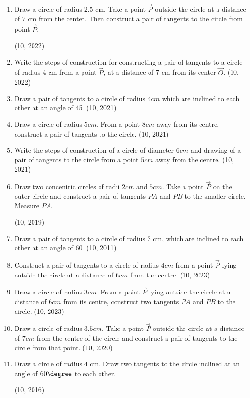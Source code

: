 \begin{enumerate}[label=\thesubsection.\arabic*,ref=\thesubsection.\theenumi]
	\item Draw a circle of radius 2.5 cm. Take a point $\vec{P}$ outside the circle at a distance of 7 cm from the center. Then construct a pair of tangents to the circle from point $\vec{P}$.

\hfill (10, 2022)
	\item Write the steps of construction for constructing a pair of tangents to a circle of radius 4 cm from a point $\vec{P}$, at a distance of 7 cm from its center $\vec{O}$.
\hfill (10, 2022)
	\item Draw a pair of tangents to a circle of radius $4 cm$ which are inclined to each other at an angle of 45\degree.	
\hfill (10, 2021)
	\item Draw a circle of radius $5 cm$. From a point $8 cm$ away from its centre, construct a pair of tangents to the circle.
\hfill (10, 2021)
	\item Write the steps of construction of a circle of diameter $6 cm$ and drawing of a pair of tangents to the circle from a point $5 cm$ away from the centre.
\hfill (10, 2021)
\item Draw two concentric circles of radii $2 cm$ and $5 cm$. Take a point $\vec{P}$ on the outer circle and construct a pair of tangents $PA$ and $PB$ to the smaller circle. Measure $PA$.  

\hfill (10, 2019)
    \item Draw a pair of tangents to a circle of radius $3$ cm, which are inclined to each other at an angle of 60\degree.
\hfill (10, 2011)
\item Construct a pair of tangents to a circle of radius $4cm$ from a point $\vec{P}$ lying outside the circle at a distance of $6cm$ from the centre.
\hfill (10, 2023)
	\item  Draw a circle of radius $3 cm$. From a point $\vec{P}$ lying outside the 
       circle at a distance of $6cm$ from its centre, construct two tangents
       $PA$ and $PB$ to the circle.
\hfill (10, 2023)
	\item Draw a circle of radius $3.5 cm$. Take a point $\vec{P}$ outside the circle at a distance of $7 cm$ from the centre of the circle and construct a pair of tangents to the circle from that point.
\hfill (10, 2020)
\item Draw a circle of radius $4$ cm. Draw two tangents to the circle inclined at an angle of $ 60 \degree $ to each other.

\hfill (10, 2016)

\end{enumerate}
